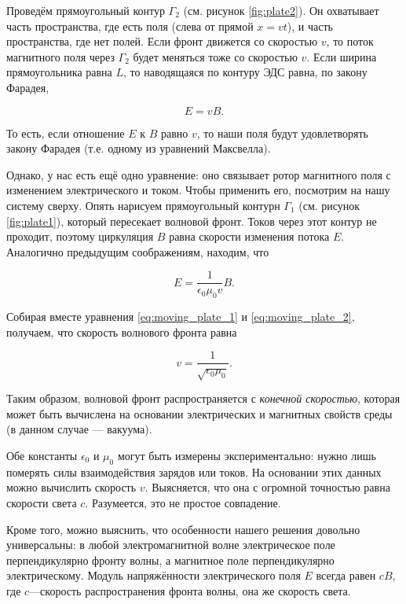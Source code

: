 \documentclass[11pt,a4paper]{article}
\numberwithin{equation}{section}
\newcommand{\eps}{\epsilon}
\begin{document}
Проведём прямоугольный контур $\Gamma_2$ (см. рисунок \ref{fig:plate2}). Он
охватывает часть пространства, где есть поля (слева от прямой $x=vt$),
и часть пространства, где нет полей. Если фронт движется со скоростью
$v$, то поток магнитного поля через $\Gamma_2$ будет меняться тоже со
скоростью $v$. Если ширина прямоугольника равна $L$, то наводящаяся по
контуру ЭДС равна, по закону Фарадея,

\begin{equation}
  \label{eq:moving_plate_1}
  E = v B.
\end{equation}

То есть, если отношение $E$ к $B$ равно $v$, то наши поля будут
удовлетворять закону Фарадея (т.е. одному из уравнений Максвелла). 

Однако, у нас есть ещё одно уравнение: оно связывает ротор магнитного
поля с изменением электрического и током. Чтобы применить его,
посмотрим на нашу систему сверху. Опять нарисуем прямоугольный контурн
$\Gamma_1$ (см. рисунок \ref{fig:plate1}), который пересекает волновой
фронт. Токов через этот контур не проходит, поэтому циркуляция $B$
равна скорости изменения потока $E$. Аналогично предыдущим
соображениям, находим, что

\begin{equation}
  \label{eq:moving_plate_2}
  E = \frac{1}{\eps_0 \mu_0 v} B.
\end{equation}

Собирая вместе уравнения \eqref{eq:moving_plate_1} и
\eqref{eq:moving_plate_2}, получаем, что скорость волнового фронта
равна 

\begin{equation}
  \label{eq:velocity_front}
  v = \frac{1}{\sqrt{\eps_0 \mu_0}}.
\end{equation}

Таким образом, волновой фронт распространяется с \textit{конечной
  скоростью}, которая может быть вычислена на основании электрических
и магнитных свойств среды (в данном случае --- вакуума). 

Обе константы $\eps_0$ и $\mu_0$ могут быть измерены
экспериментально: нужно лишь померять силы взаимодействия зарядов или
токов. На основании этих данных можно вычислить скорость
$v$. Выясняется, что она с огромной точностью равна скорости света
$c$. Разумеется, это не простое совпадение. 

Кроме того, можно выяснить, что особенности нашего решения довольно
универсальны: в любой электромагнитной волне электрическое поле
перпендикулярно фронту волны, а магнитное поле перпендикулярно
электрическому. Модуль напряжённости электрического поля $E$ всегда
равен $cB$, где $c$---скорость распространения фронта волны, она же
скорость света. 
\end{document}
